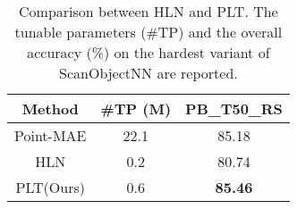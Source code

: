 \begin{table}[!t]
\scriptsize
\setlength{\tabcolsep}{7.8mm}
\centering
\caption{Comparison between HLN and PLT. The tunable parameters (\#TP) and the overall accuracy (\%) on the hardest variant of ScanObjectNN are reported. }
\vspace{-10pt}
\label{tab:sidenet}

\begin{tabular}{ccc}
\toprule
Method & \#TP (M) & PB\_T50\_RS \\
\midrule
Point-MAE & 22.1 & 85.18 \\
HLN & 0.2 & 80.74 \\
\rowcolor{linecolor!40} PLT(Ours) & 0.6 & \textbf{85.46} \\
\bottomrule
\end{tabular}
\end{table}
